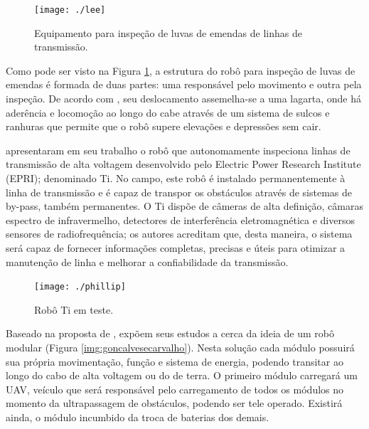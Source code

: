 \begin{figure} [h!]	
	\caption{Equipamento para inspeção de luvas de emendas de linhas de transmissão.}
	\label{img:lee}											 
	\centering													 
	\texttt{[image: ./lee]}
\end{figure}													 

Como pode ser visto na Figura \ref{img:lee}, a estrutura do robô para inspeção de luvas de emendas é formada de duas partes: uma responsável pelo movimento e outra pela inspeção. De acordo com , seu deslocamento assemelha-se a uma lagarta, onde há aderência e locomoção ao longo do cabe através de um sistema de sulcos e ranhuras que permite que o robô supere elevações e depressões sem cair.

 apresentaram em seu trabalho o robô que autonomamente inspeciona linhas de transmissão de alta voltagem desenvolvido pelo Electric Power Research Institute (EPRI); denominado Ti. No campo, este robô é instalado permanentemente à linha de transmissão e é capaz de transpor os obstáculos através de sistemas de by-pass, também permanentes. O Ti dispõe de câmeras de alta definição, câmaras espectro de infravermelho, detectores de interferência eletromagnética e diversos sensores de radiofrequência; os autores acreditam que, desta maneira, o sistema será capaz de fornecer informações completas, precisas e úteis para otimizar a manutenção de linha e melhorar a confiabilidade da transmissão. 

\begin{figure} [h!]	
	\caption{Robô Ti em teste.}
	\label{img:phillip}											 
	\centering													 
	\texttt{[image: ./phillip]}
\end{figure}													 

Baseado na proposta de ,  expõem seus estudos a cerca da ideia de um robô modular (Figura \ref{img:goncalvesecarvalho}). Nesta solução cada módulo possuirá sua própria movimentação, função e sistema de energia, podendo transitar ao longo do cabo de alta voltagem ou do de terra. O primeiro módulo carregará um UAV, veículo que será responsável pelo carregamento de todos os módulos no momento da ultrapassagem de obstáculos, podendo ser tele operado. Existirá ainda, o módulo incumbido da troca de baterias dos demais. 

